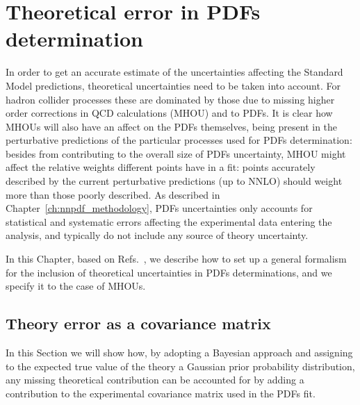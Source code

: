 \chapter{Theoretical error in PDFs determination}
\label{sec:th_error}
In order to get an accurate estimate of the uncertainties affecting the Standard Model predictions, theoretical 
uncertainties need to be taken into account. 
For hadron collider processes these are dominated by those due to missing higher order corrections in QCD calculations
(MHOU) and to PDFs. 
It is clear how MHOUs will also have an affect on the PDFs themselves, being present in the perturbative predictions
of the particular processes used for PDFs determination: besides from contributing to the overall
size of PDFs uncertainty, MHOU might affect the relative weights different points have in a fit:
points accurately described by the current perturbative predictions (up to NNLO) should weight more
than those poorly described. 
%
As described in Chapter~\ref{ch:nnpdf_methodology}, PDFs uncertainties only accounts for statistical and 
systematic errors affecting the experimental data entering the analysis, and typically do not include any source 
of theory uncertainty.

%
In this Chapter, based on Refs.~\cite{AbdulKhalek:2019bux,AbdulKhalek:2019ihb}, we describe how to set up 
a general formalism for the inclusion of theoretical uncertainties in PDFs determinations,
 and we specify it to the case of MHOUs.

 \section{Theory error as a covariance matrix}
 \label{sec:th_err_as_cov}
 In this Section we will show how, by adopting a Bayesian approach and assigning to the 
 expected true value of the theory a Gaussian prior probability distribution, any missing theoretical
 contribution can be accounted for by adding a contribution to the experimental covariance matrix used in the PDFs fit.

